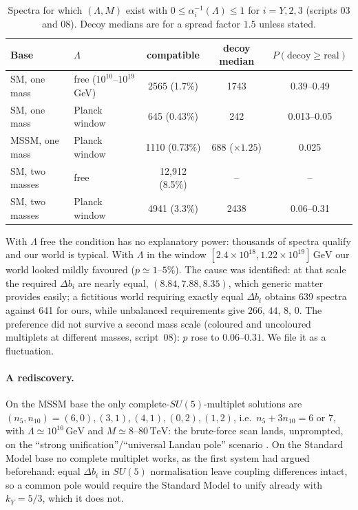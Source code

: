 \documentclass[11pt,a4paper]{article}
\newcommand{\ainv}{\alpha^{-1}}
\newcommand{\kY}{k_Y}
\newcommand{\GeV}{\,\mathrm{GeV}}
\newcommand{\TeV}{\,\mathrm{TeV}}
\begin{document}
\begin{table}[h]\centering
\caption{Spectra for which $(\Lambda,M)$ exist with $0\le\ainv_i(\Lambda)\le1$ for $i=Y,2,3$ (scripts 03 and 08). Decoy medians are for a spread factor $1.5$ unless stated.}\label{tab:scan}
\small\begin{tabular}{llccc}\toprule
Base & $\Lambda$ & compatible & decoy median & $P(\text{decoy}\ge\text{real})$\\\midrule
SM, one mass & free ($10^{10}$--$10^{19}$ GeV) & 2565 (1.7\%) & 1743 & 0.39--0.49\\
SM, one mass & Planck window & 645 (0.43\%) & 242 & 0.013--0.05\\
MSSM, one mass & Planck window & 1110 (0.73\%) & 688 ($\times1.25$) & 0.025\\
SM, two masses & free & 12{,}912 (8.5\%) & -- & --\\
SM, two masses & Planck window & 4941 (3.3\%) & 2438 & 0.06--0.31\\\bottomrule
\end{tabular}\end{table}

With $\Lambda$ free the condition has no explanatory power: thousands of spectra qualify and our world is typical.
With $\Lambda$ in the window $[2.4\times10^{18},1.22\times10^{19}]\GeV$ our world looked mildly favoured ($p\simeq1$--$5\%$).
The cause was identified: at that scale the required $\Delta b_i$ are nearly equal, $(8.84,7.88,8.35)$, which generic matter
provides easily; a fictitious world requiring exactly equal $\Delta b_i$ obtains 639 spectra against 641 for ours, while
unbalanced requirements give $266$, $44$, $8$, $0$. The preference did not survive a second mass scale
(coloured and uncoloured multiplets at different masses, script~08): $p$ rose to $0.06$--$0.31$. We file it as a fluctuation.

\paragraph{A rediscovery.} On the MSSM base the only complete-$SU(5)$-multiplet solutions are
$(n_5,n_{10})=(6,0),(3,1),(4,1),(0,2),(1,2)$, i.e.\ $n_5+3n_{10}=6$ or $7$, with $\Lambda\simeq10^{16}\GeV$ and
$M\simeq8$--$80\TeV$: the brute-force scan lands, unprompted, on the ``strong unification''/``universal Landau pole''
scenario \cite{MPP,GLR,ULP}. On the Standard Model base no complete multiplet works, as the first system had argued beforehand:
equal $\Delta b_i$ in $SU(5)$ normalisation leave coupling differences intact, so a common pole would require the Standard
Model to unify already with $\kY=5/3$, which it does not.
\end{document}
